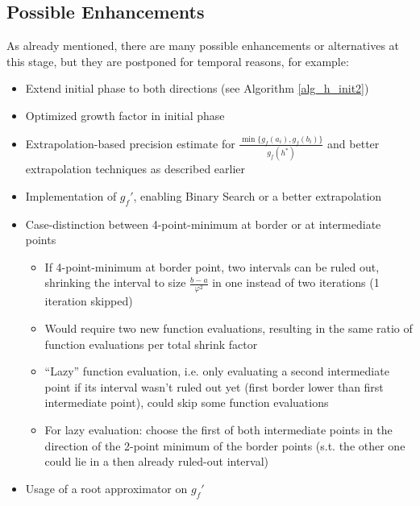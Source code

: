 \subsection{Possible Enhancements}
As already mentioned, there are many possible enhancements or alternatives at this stage, but they are postponed for temporal reasons, for example:
\begin{itemize}
\item Extend initial phase to both directions (see Algorithm \ref{alg_h_init2})
\item Optimized growth factor in initial phase
\item Extrapolation-based precision estimate for $\frac{\min\{g_f(a_i),g_f(b_i)\}}{g_f(h^*)}$ and better extrapolation techniques as described earlier
\item Implementation of $g_f'$, enabling Binary Search or a better extrapolation
\item Case-distinction between 4-point-minimum at border or at intermediate points
\begin{itemize}
\item If 4-point-minimum at border point, two intervals can be ruled out, shrinking the interval to size $\frac{b-a}{\varphi^2}$ in one instead of two iterations (1 iteration skipped)
\item Would require two new function evaluations, resulting in the same ratio of function evaluations per total shrink factor
\item ``Lazy'' function evaluation, i.e. only evaluating a second intermediate point if its interval wasn't ruled out yet (first border lower than first intermediate point), could skip some function evaluations
\item For lazy evaluation: choose the first of both intermediate points in the direction of the 2-point minimum of the border points (s.t. the other one could lie in a then already ruled-out interval)
\end{itemize}
\item Usage of a root approximator on $g_f'$
\end{itemize}

 
